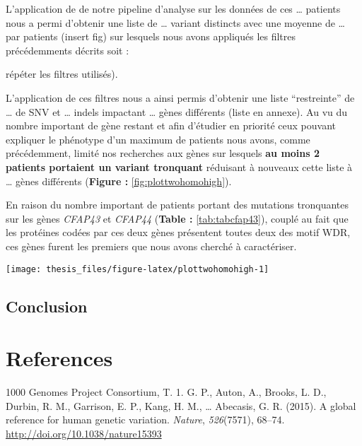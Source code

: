 \documentclass[12pt,twoside]{reedthesis}
\theoremstyle{definition}
\theoremstyle{definition}
\theoremstyle{remark}
\begin{document}
  L'application de de notre pipeline d'analyse sur les données de ces
  \ldots{} patients nous a permi d'obtenir une liste de \ldots{} variant
  distincts avec une moyenne de \ldots{} par patients (insert fig) sur
  lesquels nous avons appliqués les filtres précédemments décrits soit :
  
  répéter les filtres utilisés).
  
  L'application de ces filtres nous a ainsi permis d'obtenir une liste
  ``restreinte'' de \ldots{} de SNV et \ldots{} indels impactant \ldots{}
  gènes différents (liste en annexe). Au vu du nombre important de gène
  restant et afin d'étudier en priorité ceux pouvant expliquer le
  phénotype d'un maximum de patients nous avons, comme précédemment,
  limité nos recherches aux gènes sur lesquels \textbf{au moins 2 patients
  portaient un variant tronquant} réduisant à nouveaux cette liste à
  \ldots{} gènes différents (\textbf{Figure : }\ref{fig:plottwohomohigh}).
  
  En raison du nombre important de patients portant des mutations
  tronquantes sur les gènes \emph{CFAP43} et \emph{CFAP44} (\textbf{Table
  : }\ref{tab:tabcfap43}), couplé au fait que les protéines codées par ces
  deux gènes présentent toutes deux des motif WDR, ces gènes furent les
  premiers que nous avons cherché à caractériser.
  
  \newpage
  
  \begin{center}\texttt{[image: thesis\_files/figure-latex/plottwohomohigh-1]} \end{center}
  
  \newpage
  
  \newpage
  
  \section{Conclusion}\label{conclusion}
  
  \chapter*{References}\label{references}
  
  \hypertarget{refs}{}
  \hypertarget{ref-1000GenomesProjectConsortium2015}{}
  1000 Genomes Project Consortium, T. 1. G. P., Auton, A., Brooks, L. D.,
  Durbin, R. M., Garrison, E. P., Kang, H. M., \ldots{} Abecasis, G. R.
  (2015). A global reference for human genetic variation. \emph{Nature},
  \emph{526}(7571), 68--74. \url{http://doi.org/10.1038/nature15393}
  
\end{document}
